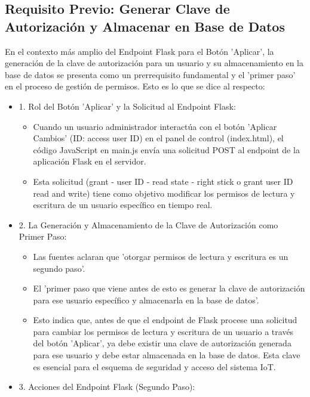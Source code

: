\documentclass{report}
\begin{document}
\subsection{Requisito Previo: Generar Clave de Autorización y Almacenar en Base de Datos}
En el contexto más amplio del Endpoint Flask para el Botón 'Aplicar', la generación de la clave de autorización para un usuario y 
su almacenamiento en la base de datos se presenta como un prerrequisito fundamental y el 'primer paso' en el proceso de gestión de permisos. 
Esto es lo que se dice al respecto:
\begin{itemize}
    \item 1. Rol del Botón 'Aplicar' y la Solicitud al Endpoint Flask:
        \begin{itemize}
            \item Cuando un usuario administrador interactúa con el botón 'Aplicar Cambios' (ID: access user ID) en el panel de control (index.html), 
            el código JavaScript en main.js envía una solicitud POST al endpoint de la aplicación Flask en el servidor.
            \item Esta solicitud (grant - user ID - read state - right stick o grant user ID read and write) tiene como objetivo modificar los permisos 
            de lectura y escritura de un usuario específico en tiempo real.
        \end{itemize}
    \item 2. La Generación y Almacenamiento de la Clave de Autorización como Primer Paso:
        \begin{itemize}
            \item Las fuentes aclaran que 'otorgar permisos de lectura y escritura es un segundo paso'.
            \item El 'primer paso que viene antes de esto es generar la clave de autorización para ese usuario específico y almacenarla en la base de datos'.
            \item Esto indica que, antes de que el endpoint de Flask procese una solicitud para cambiar los permisos de lectura y escritura de un usuario 
            a través del botón 'Aplicar', ya debe existir una clave de autorización generada para ese usuario y debe estar almacenada en la base de datos. 
            Esta clave es esencial para el esquema de seguridad y acceso del sistema IoT.
        \end{itemize}
    \item 3. Acciones del Endpoint Flask (Segundo Paso):

\end{itemize}
\end{document}
